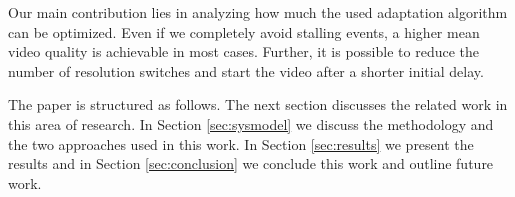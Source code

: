 Our main contribution lies in analyzing how much the used adaptation algorithm can be optimized. Even if we completely avoid stalling events, a higher mean video quality is achievable in most cases. Further, it is possible to reduce the number of resolution switches and start the video after a shorter initial delay.

The paper is structured as follows. The next section discusses the related work in this area of research. 
In Section \ref{sec:sysmodel} we discuss the methodology and the two approaches used in this work.
In Section \ref{sec:results} we present the results and in Section \ref{sec:conclusion} we conclude this work and outline future work.

